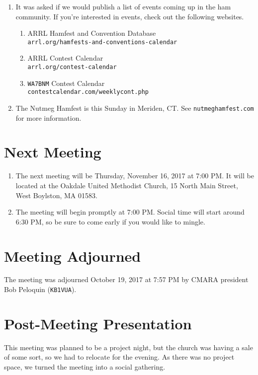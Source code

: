 \documentclass[10pt,letterpaper]{article}
\begin{document}
\begin{enumerate}
\begin{enumerate}
  \end{enumerate}
  \item It was asked if we would publish a list of events coming up in the ham community. If you're interested in events, check out the following websites.
  \begin{enumerate}
    \item ARRL Hamfest and Convention Database\\
          \texttt{arrl.org/hamfests-and-conventions-calendar}
    \item ARRL Contest Calendar\\
          \texttt{arrl.org/contest-calendar}
    \item \texttt{WA7BNM} Contest Calendar\\
          \texttt{contestcalendar.com/weeklycont.php}
  \end{enumerate}
  \item The Nutmeg Hamfest is this Sunday in Meriden, CT. See \texttt{nutmeghamfest.com} for more information.
\end{enumerate}

\section{Next Meeting}
\begin{enumerate}
  \item The next meeting will be Thursday, November 16, 2017 at 7:00 PM. It will be located at the Oakdale United Methodist Church, 15 North Main Street, West Boylston, MA 01583.
  \item The meeting will begin promptly at 7:00 PM. Social time will start around 6:30 PM, so be sure to come early if you would like to mingle.
\end{enumerate}

\section{Meeting Adjourned}
The meeting was adjourned October 19, 2017 at 7:57 PM by CMARA president Bob Peloquin (\texttt{KB1VUA}).

\section{Post-Meeting Presentation}
This meeting was planned to be a project night, but the church was having a sale of some sort, so we had to relocate for the evening. As there was no project space, we turned the meeting into a social gathering.
\end{document}
